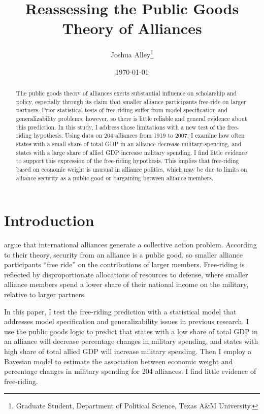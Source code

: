 \documentclass[12pt]{article}
\title{
\textbf{Reassessing the Public Goods Theory of Alliances}
	}
\author{Joshua Alley\footnote{Graduate Student,
Department of Political Science, Texas A\&M University.}}
\date{{\normalsize \today}}
\begin{document}
\maketitle 

\doublespace

\begin{abstract}
The public goods theory of alliances exerts substantial influence on scholarship and policy, especially through its claim that smaller alliance participants free-ride on larger partners. 
Prior statistical tests of free-riding suffer from model specification and generalizability problems, however, so there is little reliable and general evidence about this prediction.
In this study, I address those limitations with a new test of the free-riding hypothesis. 
Using data on 204 alliances from 1919 to 2007, I examine how often states with a small share of total GDP in an alliance decrease military spending, and states with a large share of allied GDP increase military spending. 
I find little evidence to support this expression of the free-riding hypothesis. 
This implies that free-riding based on economic weight is unusual in alliance politics, which may be due to limits on alliance security as a public good or bargaining between alliance members. 
\end{abstract} 

\newpage


\section{Introduction}



\citet{OlsonZeckhauser1966} argue that international alliances generate a collective action problem. 
According to their theory, security from an alliance is a public good, so smaller alliance participants ``free ride'' on the contributions of larger members. 
Free-riding is reflected by disproportionate allocations of resources to defense, where smaller alliance members spend a lower share of their national income on the military, relative to larger partners.


In this paper, I test the free-riding prediction with a statistical model that addresses model specification and generalizability issues in previous research. 
I use the public goods logic to predict that states with a low share of total GDP in an alliance will decrease percentage changes in military spending, and states with high share of total allied GDP will increase military spending.
Then I employ a Bayesian model to estimate the association between economic weight and percentage changes in military spending for 204 alliances. 
I find little evidence of free-riding. 
\end{document}
